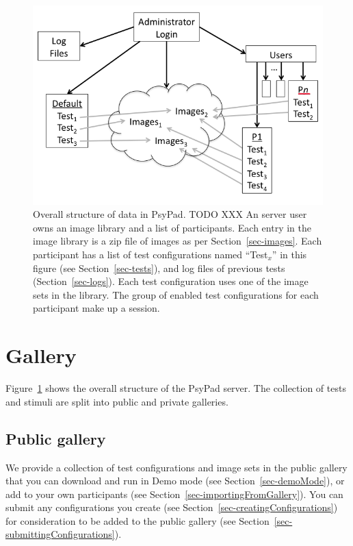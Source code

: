 \documentclass{article}
\begin{document}
\begin{figure}
\begin{center}
\includegraphics[scale=0.6]{overview}

\caption{\label{fig-overview}Overall structure of data in PsyPad.
TODO XXX An server user owns an image library and a list of participants.
Each entry in the image library is a zip file of images as per
Section~\ref{sec-images}. Each participant has a list of test
configurations named ``Test$_x$'' in this figure (see Section~\ref{sec-tests}), 
and log files of
previous tests (Section~\ref{sec-logs}). 
Each test configuration uses one of the image sets in
the library. 
The group of enabled test configurations for each
participant make up a session.}

\end{center}
\end{figure}

\section{Gallery}

Figure~\ref{fig-overview} shows the overall structure of the PsyPad server.
The collection of tests and
stimuli are split into public and private galleries.


\subsection{Public gallery}
\label{sec-publicGallery}


We provide a collection of test configurations and image sets in the public gallery that you can download and run in
Demo mode (see Section~\ref{sec-demoMode}), or add to your own 
participants (see Section~\ref{sec-importingFromGallery}). You can submit any configurations you create (see Section~\ref{sec-creatingConfigurations}) for consideration to be added to the public gallery (see Section~\ref{sec-submittingConfigurations}).
\end{document}
